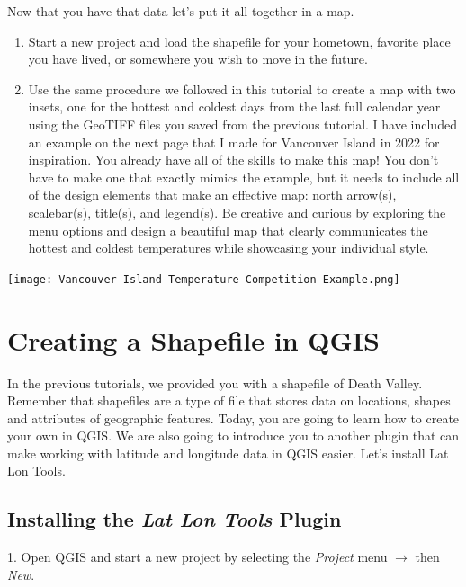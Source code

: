 \documentclass[oneside,a4paper,11pt,explicit]{book}
\begin{document}
\begin{tcolorbox}[colback=yellow!5!white,colframe=IceCreamLeaf,title=\textbf{Temperature Competition Next Steps}]
	Now that you have that data let's put it all together in a map.
	\begin{enumerate}
		\item Start a new project and load the shapefile for your hometown, favorite place you have lived, or somewhere you wish to move in the future.
		\item Use the same procedure we followed in this tutorial to create a map with two insets, one for the hottest and coldest days from the last full calendar year using the GeoTIFF files you saved from the previous tutorial. I have included an example on the next page that I made for Vancouver Island in 2022 for inspiration. You already have all of the skills to make this map! You don't have to make one that exactly mimics the example, but it needs to include all of the design elements that make an effective map: north arrow(s), scalebar(s), title(s), and legend(s). Be creative and curious by exploring the menu options and design a beautiful map that clearly communicates the hottest and coldest temperatures while showcasing your individual style.
	\end{enumerate}
\end{tcolorbox}

\centerline{\texttt{[image: Vancouver Island Temperature Competition Example.png]}}

	
	\section{Creating a Shapefile in QGIS}
	
	In the previous tutorials, we provided you with a shapefile of Death Valley. Remember that shapefiles are a type of file that stores data on locations, shapes and attributes of geographic features. Today, you are going to learn how to create your own in QGIS. We are also going to introduce you to another plugin that can make working with latitude and longitude data in QGIS easier. Let's install Lat Lon Tools. 
	
	\subsection{Installing the \textit{Lat Lon Tools} Plugin}
	
	1. Open QGIS and start a new project by selecting the \textit{Project} menu $\rightarrow$ then \textit{New}. 
	
\end{document}
